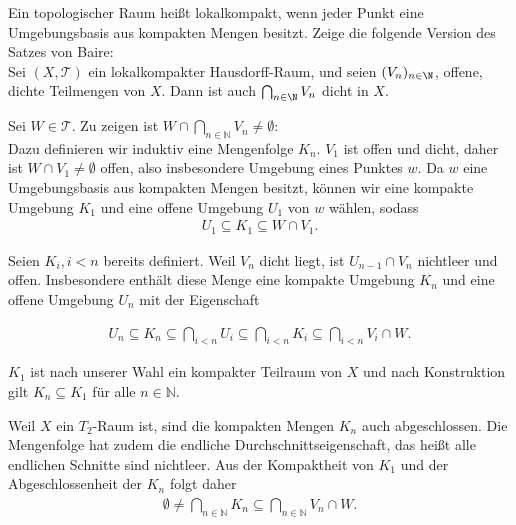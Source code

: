\begin{exercise}
Ein topologischer Raum heißt lokalkompakt, wenn jeder Punkt eine Umgebungsbasis
aus kompakten Mengen besitzt. Zeige die folgende Version des Satzes von Baire: \\
Sei $(X,\mathcal{T})$ ein lokalkompakter Hausdorff-Raum, und seien $(V_n)_{n \in \N}$,
offene, dichte Teilmengen von $X$. Dann ist auch $\bigcap_{n \in \N} V_n$ dicht in $X$.
\end{exercise}
\begin{solution}
  Sei $W \in \mathcal{T}.$ Zu zeigen ist $W \cap \bigcap_{n \in \mathbb{N}} V_n \neq \emptyset$: \\
  Dazu definieren wir induktiv eine Mengenfolge $K_n$.
  $V_1$ ist offen und dicht, daher ist $W \cap V_1 \neq \emptyset$ offen, also insbesondere Umgebung eines Punktes $w$. Da $w$ eine Umgebungsbasis aus kompakten Mengen besitzt, können wir eine kompakte Umgebung $K_1$ und eine offene Umgebung $U_1$ von $w$ wählen, sodass
  \begin{align*}
    U_1 \subseteq K_1 \subseteq W \cap V_1.
  \end{align*}

  Seien $K_i, i < n$ bereits definiert. Weil $V_n$ dicht liegt, ist $U_{n-1} \cap V_n$ nichtleer und offen. Insbesondere enthält diese Menge eine kompakte Umgebung $K_n$ und eine offene Umgebung $U_n$ mit der Eigenschaft

  \begin{align}
      U_n \subseteq K_n \subseteq \bigcap_{i < n} U_i
      \subseteq \bigcap_{i < n} K_i \subseteq \bigcap_{i < n} V_i \cap W.
  \end{align}

  $K_1$ ist nach unserer Wahl ein kompakter Teilraum von $X$ und nach Konstruktion gilt $K_n \subseteq K_1$ für alle $n \in \mathbb{N}$.

  Weil $X$ ein $T_2$-Raum ist, sind die kompakten Mengen $K_n$ auch abgeschlossen. Die Mengenfolge hat zudem die endliche Durchschnittseigenschaft, das heißt alle endlichen Schnitte sind nichtleer. Aus der Kompaktheit von $K_1$ und der Abgeschlossenheit der $K_n$ folgt daher
  \begin{align}
      \emptyset \neq \bigcap_{n \in \mathbb{N}} K_n \subseteq \bigcap_{n \in \mathbb{N}} V_n \cap W.
  \end{align}
\end{solution}
